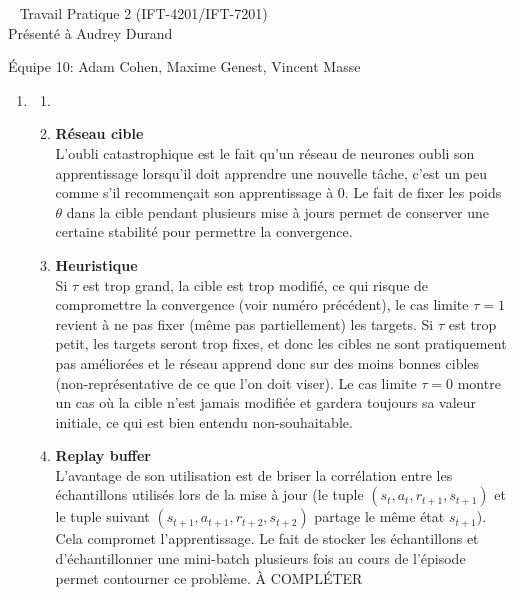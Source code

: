 \documentclass[letterpaper,11pt]{article}
\begin{document}
\begin{center}
~
\vfill
\LARGE{Travail Pratique 2 (IFT-4201/IFT-7201)}\\[0.4cm]

\Large{Présenté à Audrey Durand}

\vfill
\large{Équipe 10: Adam Cohen, Maxime Genest, Vincent Masse}

\vfill
\thispagestyle{empty}

\end{center}

\clearpage

\pagestyle{fancy}


\begin{enumerate}

\item

\begin{enumerate}

\item 

\item \textbf{Réseau cible}\\
L'oubli catastrophique est le fait qu'un réseau de neurones oubli son apprentissage lorsqu'il doit apprendre une nouvelle tâche, c'est un peu comme s'il recommençait son apprentissage à 0. Le fait de fixer les poids $\theta$ dans la cible pendant plusieurs mise à jours permet de conserver une certaine stabilité pour permettre la convergence.

\item \textbf{Heuristique}\\
Si $\tau$ est trop grand, la cible est trop modifié, ce qui risque de compromettre la convergence (voir numéro précédent), le cas limite $\tau=1$ revient à ne pas fixer (même pas partiellement) les targets. Si $\tau$ est trop petit, les targets seront trop fixes, et donc les cibles ne sont pratiquement pas améliorées et le réseau apprend donc sur des moins bonnes cibles (non-représentative de ce que l'on doit viser). Le cas limite $\tau=0$ montre un cas où la cible n'est jamais modifiée et gardera toujours sa valeur initiale, ce qui est bien entendu non-souhaitable. 

\item \textbf{Replay buffer}\\
L'avantage de son utilisation est de briser la corrélation entre les échantillons utilisés lors de la mise à jour (le tuple $(s_t, a_t, r_{t+1}, s_{t+1})$ et le tuple suivant $(s_{t+1}, a_{t+1}, r_{t+2}, s_{t+2})$ partage le même état $s_{t+1}$). Cela compromet l'apprentissage. Le fait de stocker les échantillons et d'échantillonner une mini-batch plusieurs fois au cours de l'épisode permet contourner ce problème. À COMPLÉTER  


\end{enumerate}
\end{enumerate}
\end{document}

